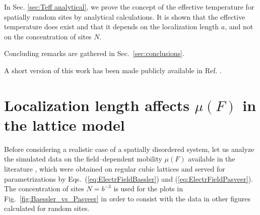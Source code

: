 \documentclass[aps,reprint,amsmath,amssymb,superscriptaddress,showpacs,prb]{revtex4-1}
\begin{document}
In Sec. \ref{sec:Teff analytical}, we prove the concept of the effective temperature for spatially random sites by analytical calculations.  It is shown that the effective temperature does exist and that it depends on the localization length $a$, and not on the concentration of sites $N$.

Concluding remarks are gathered in Sec.~\ref{sec:conclusions}.

A short version of this work has been made publicly available in Ref. \cite{Nenashev_ARKHIV2017}.






\section{Localization length affects $\mu(F)$ in the lattice model}
\label{sec:alpha is relevant on lattices}

Before considering a realistic case of a spatially disordered system, let us analyze the simulated data on the field--dependent mobility $\mu(F)$ available in the literature \cite{Bassler1993,Pasveer2005}, which were obtained on regular cubic lattices and served for parametrizations by Eqs.~(\ref{eq:ElectrFieldBassler}) and (\ref{eq:ElectrFieldPasveer}). The concentration of sites $N={b^{-3}}$ is used for the plots in Fig.~\ref{fig:Baessler_vs_Pasveer} in order to consist with the data in other figures calculated for random sites.
\end{document}
